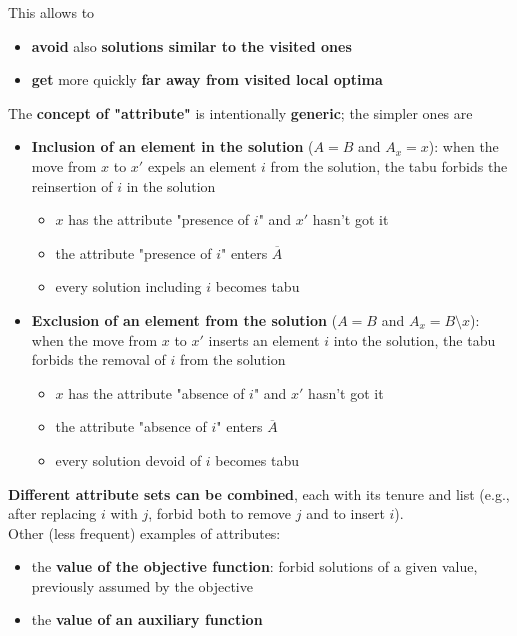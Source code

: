 This allows to
\begin{itemize}
	\item \textbf{avoid} also \textbf{solutions similar to the visited ones}
	\item \textbf{get} more quickly \textbf{far away from visited local optima}
\end{itemize}

\newpage

The \textbf{concept of "attribute"} is intentionally \textbf{generic}; the simpler ones are
\begin{itemize}
	\item \textbf{Inclusion of an element in the solution} ($A = B$ and $A_x = x$): when the move from $x$ to $x'$ expels an element $i$ from the solution, the tabu forbids the reinsertion of $i$ in the solution
	\begin{itemize}
		\item $x$ has the attribute "presence of $i$" and $x'$ hasn't got it
		\item the attribute "presence of $i$" enters $\overline{A}$
		\item every solution including $i$ becomes tabu
	\end{itemize}
	\nn
	
	\item \textbf{Exclusion of an element from the solution} ($A = B$ and $A_x = B \setminus x$): when the move from $x$ to $x'$ inserts an element $i$ into the solution, the tabu forbids the removal of $i$ from the solution
	\begin{itemize}
		\item $x$ has the attribute "absence of $i$" and $x'$ hasn't got it
		\item the attribute "absence of $i$" enters $\overline{A}$
		\item every solution devoid of $i$ becomes tabu
	\end{itemize}
	\nn
\end{itemize}

\textbf{Different attribute sets can be combined}, each with its tenure and list (e.g., after replacing $i$ with $j$, forbid both to remove $j$ and to insert $i$).\\

Other (less frequent) examples of attributes:
\begin{itemize}
	\item the \textbf{value of the objective function}: forbid solutions of a given value, previously assumed by the objective
	\item the \textbf{value of an auxiliary function}
\end{itemize}

